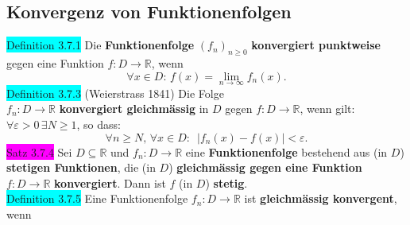 \documentclass[landscape, 10pt]{article}
\newcommand{\R}{\mathbb{R}}
\begin{document}
\begin{multicols}{3}
       \subsection{Konvergenz von Funktionenfolgen}
              \colorbox{cyan}{Definition 3.7.1} 
                     Die \textbf{Funktionenfolge} 
                     \textcolor{NavyBlue}{$(f_n)_{n\geqslant0}$}
                     \textbf{konvergiert punktweise} 
                     gegen eine Funktion
                     \textcolor{NavyBlue}{
                     $f:D\longrightarrow\R$}, wenn 
                     \begin{equation*}
                            \forall x\in D:\,
                            f(x)
                            =\lim\limits_{n\to\infty}f_n(x).
                     \end{equation*}
              \colorbox{cyan}{Definition 3.7.3} 
              (Weierstrass 1841) 
                     Die Folge \\
                     \textcolor{NavyBlue}{$f_n:D\longrightarrow\R$} 
                     \textbf{konvergiert gleichmässig} in 
                     \textcolor{NavyBlue}{$D$} gegen 
                     \textcolor{NavyBlue}{$f:D\longrightarrow\R$}, 
                     wenn gilt: 
                     \textcolor{NavyBlue}{
                     $\forall\varepsilon>0\,\exists N\geqslant1$}, 
                     so dass: 
                     \begin{equation*}
                            \forall n\geqslant N,\,
                            \forall x\in D:\enspace 
                            |f_n(x)-f(x)|<\varepsilon.
                     \end{equation*}
              \colorbox{magenta}{Satz 3.7.4} 
                     Sei \textcolor{NavyBlue}{$D\subseteq\R$} und 
                     \textcolor{NavyBlue}{$f_n:D\longrightarrow\R$} 
                     eine \textbf{Funktionenfolge} bestehend aus 
                     (in $D$) \textbf{stetigen Funktionen}, die 
                     (in $D$) \textbf{gleichmässig gegen eine 
                     Funktion} \textcolor{NavyBlue}{
                     $f:D\longrightarrow\R$} 
                     \textbf{konvergiert}. 
                     Dann ist \textcolor{NavyBlue}{$f$}
                     (in $D$) \textbf{stetig}.\\
              \colorbox{cyan}{Definition 3.7.5} 
                     Eine Funktionenfolge 
                     \textcolor{NavyBlue}{$f_n:D\longrightarrow\R$}
                     ist \textbf{gleichmässig konvergent}, wenn 

\end{multicols}
\end{document}
